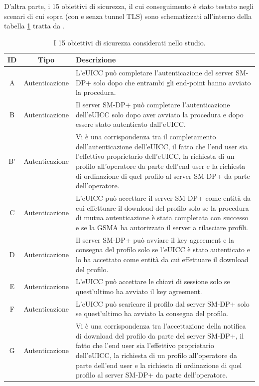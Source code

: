 \documentclass[10pt, oneside]{book}
\begin{document}
\noindent D'altra parte, i 15 obiettivi di sicurezza, il cui conseguimento è stato testato negli scenari di cui sopra (con e senza tunnel TLS) sono schematizzati all'interno della tabella \ref{tab:security-goals} tratta da \cite{Sec-analysis}.
\begin{table}[h!]
\begin{center}
\captionsetup{skip=4pt}
\caption{I 15 obiettivi di sicurezza considerati nello studio.}
\label{tab:security-goals}
\begin{tabularx}{\textwidth}{|c|c|X|} %
\hline
\textbf{ID} & \textbf{Tipo} & \textbf{Descrizione}\\
\hline
A & Autenticazione & L'eUICC può completare l'autenticazione del server SM-DP+ solo dopo che entrambi gli end-point hanno avviato la procedura.\\
\hline
B & Autenticazione & Il server SM-DP+ può completare l'autenticazione dell'eUICC solo dopo aver avviato la procedura e dopo essere stato autenticato dall'eUICC.\\
\hline
B' & Autenticazione & Vi è una corrispondenza tra il completamento dell'autenticazione dell'eUICC, il fatto che l'end user sia l'effettivo proprietario dell'eUICC, la richiesta di un profilo all'operatore da parte dell'end user e la richiesta di ordinazione di quel profilo al server SM-DP+ da parte dell'operatore.\\
\hline
C & Autenticazione & L'eUICC può accettare il server SM-DP+ come entità da cui effettuare il download del profilo solo se la procedura di mutua autenticazione è stata completata con successo e se la GSMA ha autorizzato il server a rilasciare profili.\\
\hline
D & Autenticazione & Il server SM-DP+ può avviare il key agreement e la consegna del profilo solo se l'eUICC è stato autenticato e lo ha accettato come entità da cui effettuare il download del profilo.\\
\hline
E & Autenticazione & L'eUICC può accettare le chiavi di sessione solo se quest'ultimo ha avviato il key agreement.\\
\hline
F & Autenticazione & L'eUICC può scaricare il profilo dal server SM-DP+ solo se quest'ultimo ha avviato la consegna del profilo.\\
\hline
G & Autenticazione & Vi è una corrispondenza tra l'accettazione della notifica di download del profilo da parte del server SM-DP+, il fatto che l'end user sia l'effettivo proprietario dell'eUICC, la richiesta di un profilo all'operatore da parte dell'end user e la richiesta di ordinazione di quel profilo al server SM-DP+ da parte dell'operatore.\\

\end{tabularx}
\end{center}
\end{table}
\end{document}
